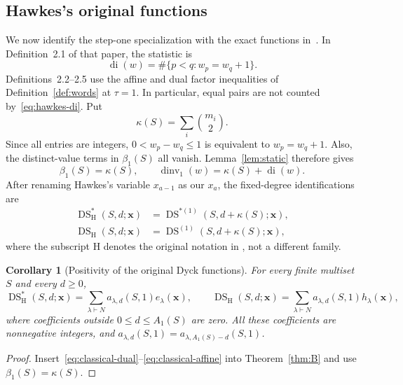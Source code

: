 \documentclass[11pt,reqno]{amsart}
\newcommand{\xx}{\mathbf x}
\newcommand{\DS}{\operatorname{DS}}
\newcommand{\dinv}{\operatorname{dinv}}
\newcommand{\di}{\operatorname{di}}
\newtheorem{corollary}[theorem]{Corollary}
\theoremstyle{definition}
\theoremstyle{remark}
\numberwithin{equation}{section}
\begin{document}
\subsection{Hawkes's original functions}
We now identify the step-one specialization with the exact functions
in~\cite{Hawkes2026}.  In Definition~2.1 of that paper, the statistic is
\begin{equation}\label{eq:hawkes-di}
 \di(w)=\#\{p<q:w_p=w_q+1\}.
\end{equation}
Definitions~2.2--2.5 use the affine and dual factor inequalities of
Definition~\ref{def:words} at $\tau=1$.  In particular, equal pairs
are not counted by~\eqref{eq:hawkes-di}.  Put
\begin{equation}\label{eq:kappa}
 \kappa(S)=\sum_i\binom{m_i}{2}.
\end{equation}
Since all entries are integers, $0<w_p-w_q\leq1$ is equivalent to
$w_p=w_q+1$.  Also, the distinct-value terms in $\beta_1(S)$ all
vanish.  Lemma~\ref{lem:static} therefore gives
\begin{equation}\label{eq:classical-shift}
 \beta_1(S)=\kappa(S),\qquad
 \dinv_1(w)=\kappa(S)+\di(w).
\end{equation}
After renaming Hawkes's variable $x_{a-1}$ as our $x_a$, the fixed-degree
identifications are
\begin{align}
 \DS^*_{\mathrm H}(S,d;\xx)
    &=\DS^{*(1)}(S,d+\kappa(S);\xx),\label{eq:classical-dual}\\
 \DS_{\mathrm H}(S,d;\xx)
    &=\DS^{(1)}(S,d+\kappa(S);\xx),\label{eq:classical-affine}
\end{align}
where the subscript $\mathrm H$ denotes the original notation in
\cite[Definition~2.5]{Hawkes2026}, not a different family.

\begin{corollary}[Positivity of the original Dyck functions]\label{cor:classical}
For every finite multiset $S$ and every $d\geq0$,
\begin{equation}\label{eq:classical-expansion}
 \DS^*_{\mathrm H}(S,d;\xx)
    =\sum_{\lambda\vdash N}a_{\lambda,d}(S,1)e_\lambda(\xx),
 \qquad
 \DS_{\mathrm H}(S,d;\xx)
    =\sum_{\lambda\vdash N}a_{\lambda,d}(S,1)h_\lambda(\xx),
\end{equation}
where coefficients outside $0\leq d\leq A_1(S)$ are zero.  All these
coefficients are nonnegative integers, and
$a_{\lambda,d}(S,1)=a_{\lambda,A_1(S)-d}(S,1)$.
\end{corollary}
\begin{proof}
Insert~\eqref{eq:classical-dual}--\eqref{eq:classical-affine} into
Theorem~\ref{thm:B} and use $\beta_1(S)=\kappa(S)$.
\end{proof}
\end{document}
